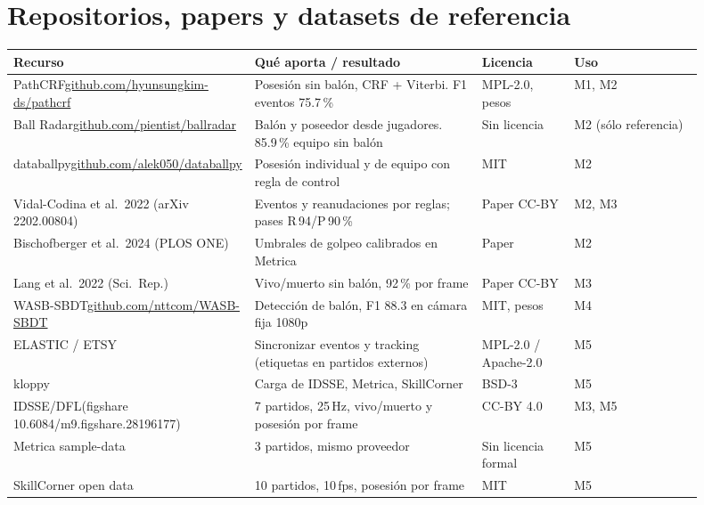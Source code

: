 \documentclass[11pt,a4paper]{article}
\begin{document}
\section{Repositorios, papers y datasets de referencia}

{\small
\begin{longtable}{p{0.2\linewidth} p{0.36\linewidth} p{0.14\linewidth} p{0.2\linewidth}}
\toprule
\textbf{Recurso} & \textbf{Qu\'e aporta / resultado} & \textbf{Licencia} & \textbf{Uso} \\
\midrule
\endhead
PathCRF\newline\url{github.com/hyunsungkim-ds/pathcrf} & Posesi\'on sin bal\'on, CRF + Viterbi.
F1 eventos 75.7\,\% & MPL-2.0, pesos & M1, M2 \\
Ball Radar\newline\url{github.com/pientist/ballradar} & Bal\'on y poseedor desde jugadores.
85.9\,\% equipo sin bal\'on & Sin licencia & M2 (s\'olo referencia) \\
databallpy\newline\url{github.com/alek050/databallpy} & Posesi\'on individual y de equipo con
regla de control & MIT & M2 \\
Vidal-Codina et al.\ 2022 (arXiv 2202.00804) & Eventos y reanudaciones por reglas; pases
R\,94/P\,90\,\% & Paper CC-BY & M2, M3 \\
Bischofberger et al.\ 2024 (PLOS ONE) & Umbrales de golpeo calibrados en Metrica & Paper & M2 \\
Lang et al.\ 2022 (Sci.\ Rep.) & Vivo/muerto sin bal\'on, 92\,\% por frame & Paper CC-BY & M3 \\
WASB-SBDT\newline\url{github.com/nttcom/WASB-SBDT} & Detecci\'on de bal\'on, F1 88.3 en c\'amara
fija 1080p & MIT, pesos & M4 \\
ELASTIC / ETSY & Sincronizar eventos y tracking (etiquetas en partidos externos) & MPL-2.0 /
Apache-2.0 & M5 \\
kloppy & Carga de IDSSE, Metrica, SkillCorner & BSD-3 & M5 \\
\midrule
IDSSE/DFL\newline(figshare 10.6084/m9.figshare.28196177) & 7 partidos, 25\,Hz, vivo/muerto y
posesi\'on por frame & CC-BY 4.0 & M3, M5 \\
Metrica sample-data & 3 partidos, mismo proveedor & Sin licencia formal & M5 \\
SkillCorner open data & 10 partidos, 10\,fps, posesi\'on por frame & MIT & M5 \\
\bottomrule
\end{longtable}
}
\end{document}

